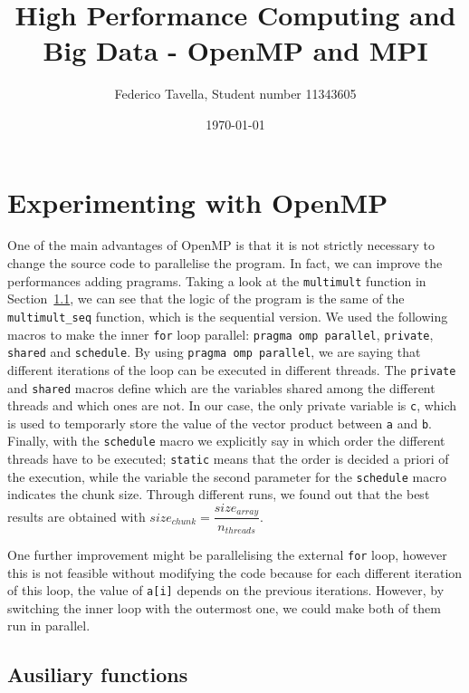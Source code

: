 \documentclass[a4paper]{article}
\title{High Performance Computing and Big Data - OpenMP and MPI}
\author{Federico Tavella, Student number 11343605}
\date{\today}
\begin{document}
\maketitle

\section{Experimenting with OpenMP}

One of the main advantages of OpenMP is that it is not strictly necessary to change the source code to parallelise the program. In fact, we can improve the performances adding pragrams. Taking a look at the \texttt{multimult} function in Section~\ref{subsec:ausiliary}, we can see that the logic of the program is the same of the \texttt{multimult\_seq} function, which is the sequential version. We used the following macros to make the inner \texttt{for} loop parallel: \texttt{pragma omp parallel}, \texttt{private}, \texttt{shared} and \texttt{schedule}. By using \texttt{pragma omp parallel}, we are saying that different iterations of the loop can be executed in different threads. The \texttt{private} and \texttt{shared} macros define which are the variables shared among the different threads and which ones are not. In our case, the only private variable is \texttt{c}, which is used to temporarly store the value of the vector product between \texttt{a} and \texttt{b}. Finally, with the \texttt{schedule} macro we explicitly say in which order the different threads have to be executed; \texttt{static} means that the order is decided a priori of the execution, while the variable the second parameter for the \texttt{schedule} macro indicates the chunk size. Through different runs, we found out that the best results are obtained with $size_{chunk} = \dfrac{size_{array}}{n_{threads}}$.

One further improvement might be parallelising the external \texttt{for} loop, however this is not feasible without modifying the code because for each different iteration of this loop, the value of \texttt{a[i]} depends on the previous iterations. However, by switching the inner loop with the outermost one, we could make both of them run in parallel.

\subsection{Ausiliary functions}\label{subsec:ausiliary}
\end{document}
